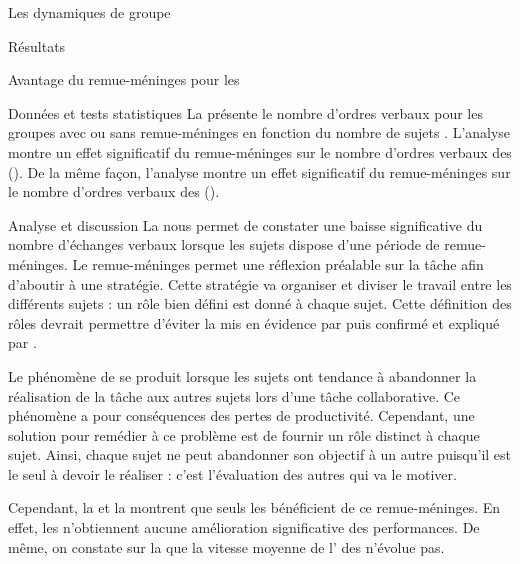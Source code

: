 \documentclass[myfrancais]{mythesis}
\begin{document}
\begin{mychapter}{Les dynamiques de groupe}
\begin{mysection}{Résultats}
\begin{mysubsection}{Avantage du remue-méninges pour les }
\begin{mysubsubsection}{Données et tests statistiques}
					La  présente le nombre d'ordres verbaux  pour les groupes avec ou sans remue-méninges  en fonction du nombre de sujets .
					L'analyse montre un effet significatif du remue-méninges  sur le nombre d'ordres verbaux  des  ().
					De la même façon, l'analyse montre un effet significatif du remue-méninges  sur le nombre d'ordres verbaux  des  ().
				\end{mysubsubsection}
				\begin{mysubsubsection}{Analyse et discussion}
					La  nous permet de constater une baisse significative du nombre d'échanges verbaux lorsque les sujets dispose d'une période de remue-méninges.
					Le remue-méninges permet une réflexion préalable sur la tâche afin d'aboutir à une stratégie.
					Cette stratégie va organiser et diviser le travail entre les différents sujets : un rôle bien défini est donné à chaque sujet.
					Cette définition des rôles devrait permettre d'éviter la  mis en évidence par  puis confirmé et expliqué par .

					Le phénomène de  se produit lorsque les sujets ont tendance à abandonner la réalisation de la tâche aux autres sujets lors d'une tâche collaborative.
					Ce phénomène a pour conséquences des pertes de productivité.
					Cependant, une solution pour remédier à ce problème est de fournir un rôle distinct à chaque sujet.
					Ainsi, chaque sujet ne peut abandonner son objectif à un autre puisqu'il est le seul à devoir le réaliser : c'est l'évaluation des autres qui va le motiver.

					Cependant, la  et la  montrent que seuls les  bénéficient de ce remue-méninges.
					En effet, les  n'obtiennent aucune amélioration significative des performances.
					De même, on constate sur la  que la vitesse moyenne de l' des  n'évolue pas.


\end{mysubsubsection}
\end{mysubsection}
\end{mysection}
\end{mychapter}
\end{document}
